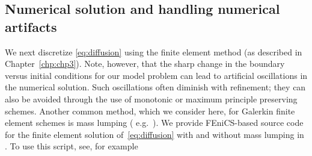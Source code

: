 \subsection{Numerical solution and handling numerical artifacts}
We next discretize \eqref{eq:diffusion} using the finite element
method (as described in Chapter~\ref{chp:chp3}). Note, however, that the
sharp change in the boundary versus initial conditions for our model
problem can lead to artificial oscillations in the numerical
solution. Such oscillations often diminish with refinement; they can
also be avoided through the use of monotonic or maximum principle
preserving schemes. Another common method, which we consider here, for
Galerkin finite element schemes is mass lumping (%
e.g.~\cite{langtangen2016solving}). We provide FEniCS-based source
code for the finite element solution of~\eqref{eq:diffusion} with and
without mass lumping in . To use
this script, see, for example 

